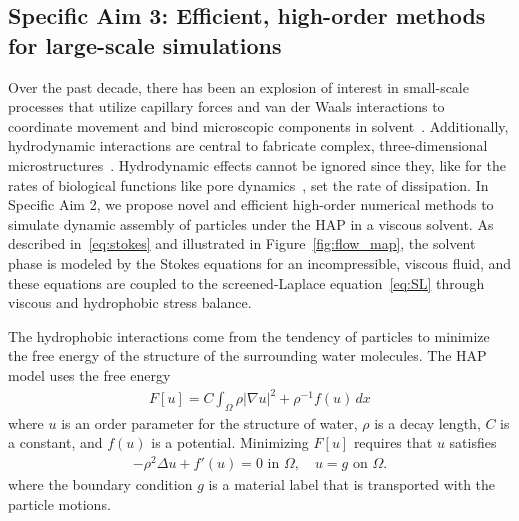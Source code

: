 \subsection{Specific Aim 3: Efficient, high-order methods for
large-scale simulations}
\label{subsec:specific_aim_3}
Over the past decade, there has been an explosion of interest in
small-scale processes that utilize capillary forces and van der Waals
interactions to coordinate movement and bind microscopic components in
solvent~\cite{Pandey2011, Zhang2017, Siontorou2017}. Additionally,
hydrodynamic interactions are central to fabricate complex,
three-dimensional microstructures~\cite{Dasgupta2017, Leong2007,
Reynolds2019, Cho2010}. Hydrodynamic effects cannot be ignored since
they, like for the rates of biological functions like pore
dynamics~\cite{RYHAM20112929}, set the rate of dissipation. In Specific
Aim 2, we propose novel and efficient high-order numerical methods to
simulate dynamic assembly of particles under the HAP in a viscous
solvent. As described in~\eqref{eq:stokes} and illustrated in
Figure~\ref{fig:flow_map}, the solvent phase is modeled by the Stokes
equations for an incompressible, viscous fluid, and these equations are
coupled to the screened-Laplace equation~\eqref{eq:SL} through viscous
and hydrophobic stress balance. 
 

The hydrophobic interactions come from the tendency of particles to
minimize the free energy of the structure of the surrounding water
molecules. The HAP model uses the free energy
\begin{align}
\label{eq:free_energy}
F[u] = C \int_{\Omega} \rho |\nabla u|^2 + \rho^{-1} f(u) \,dx
\end{align}
where $u$ is an order parameter for the structure of water, $\rho$ is a
decay length, $C$ is a constant, and $f(u)$ is a potential.
Minimizing $F[u]$ requires that $u$ satisfies 
\begin{align}
  \label{eq:SL}
  -\rho^2 \Delta u + f'(u) = 0  \text{ in } \Omega,\quad u = g
  \text{ on } \Omega.
\end{align}
where the boundary condition $g$ is a material label that is transported
with the particle motions.



